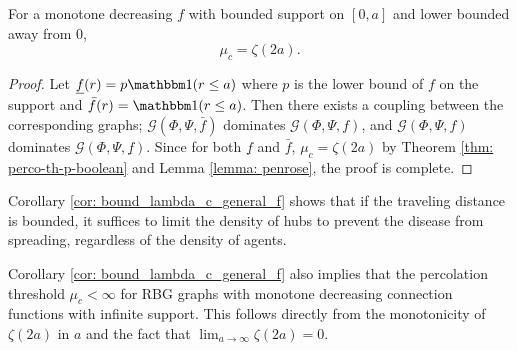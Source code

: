 \begin{corollary}    \label{cor: bound_lambda_c_general_f}
    For a monotone decreasing $f$ with bounded support on $[0,a]$ and  lower bounded away from 0, 
    \[\mu_c = \zeta(2a).\]
\end{corollary}
\begin{proof}
Let $\underline{f}(r) = p\ind(r\leq a)$ where $p$ is the lower bound of $f$ on the support and $\bar{f}(r)=\ind(r\leq a)$. Then  there exists a coupling between the corresponding graphs;  $\mathcal{G}\left(\Phi,\Psi,\bar{f}\right)$ dominates $\mathcal{G}\left(\Phi,\Psi,f\right)$, and $\mathcal{G}\left(\Phi,\Psi,f\right)$ dominates $\mathcal{G}\left(\Phi,\Psi,\underline{f}\right)$. 
Since for both $\underline{f}$ and $\bar{f}$, $\mu_c  = \zeta(2a)$ by Theorem \ref{thm: perco-th-p-boolean} and Lemma \ref{lemma: penrose},  the proof is complete.
\end{proof}
\begin{remark}
\label{remark: bounded_travel} 
    Corollary \ref{cor: bound_lambda_c_general_f} shows that if  the traveling distance is bounded, it suffices to limit the density of hubs to prevent the disease from spreading, regardless of the density of agents.   
\end{remark}
Corollary \ref{cor: bound_lambda_c_general_f} also implies that the percolation threshold $\mu_c<\infty$ for RBG graphs with monotone decreasing connection functions with infinite support. This follows directly from the monotonicity of $\zeta(2a)$ in $a$ and the fact that $\lim_{a\to\infty}\zeta(2a)=0$.
 

